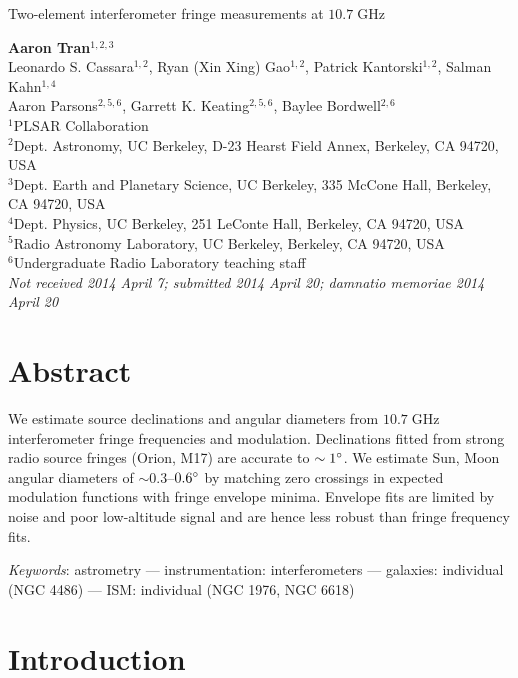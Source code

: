 \documentclass[10pt]{article}
\newcommand {\mt}{\mathrm}
\newcommand {\unit}[1]{\; \mt{#1}}
\begin{document}
\begin{center}
\Large{Two-element interferometer fringe measurements at $10.7 \unit{GHz}$}

\normalsize
\textbf{Aaron Tran}${}^{1,2,3}$ \\
Leonardo S. Cassara${}^{1,2}$, Ryan (Xin Xing) Gao${}^{1,2}$, Patrick Kantorski${}^{1,2}$, Salman Kahn${}^{1,4}$ \\
Aaron Parsons${}^{2,5,6}$, Garrett K. Keating${}^{2,5,6}$, Baylee Bordwell${}^{2,6}$ \\
\footnotesize
${}^1$PLSAR Collaboration \\
${}^2$Dept. Astronomy, UC Berkeley, D-23 Hearst Field Annex, Berkeley, CA 94720, USA \\
${}^3$Dept. Earth and Planetary Science, UC Berkeley, 335 McCone Hall, Berkeley, CA 94720, USA \\
${}^4$Dept. Physics, UC Berkeley, 251 LeConte Hall, Berkeley, CA 94720, USA \\
${}^5$Radio Astronomy Laboratory, UC Berkeley, Berkeley, CA 94720, USA \\
${}^6$Undergraduate Radio Laboratory teaching staff \\
\textit{Not received 2014 April 7; submitted 2014 April 20; damnatio memoriae 2014 April 20}
\end{center}

\section*{Abstract}

We estimate source declinations and angular diameters from $10.7 \unit{GHz}$ interferometer fringe frequencies and modulation.  Declinations fitted from strong radio source fringes (Orion, M17) are accurate to $\sim1\degree$.  We estimate Sun, Moon angular diameters of $\sim0.3$--$0.6\degree$ by matching zero crossings in expected modulation functions with fringe envelope minima.  Envelope fits are limited by noise and poor low-altitude signal and are hence less robust than fringe frequency fits.

\textit{Keywords}: astrometry --- instrumentation: interferometers --- galaxies: individual (NGC 4486) --- ISM: individual (NGC 1976, NGC 6618)

\section{Introduction}
\end{document}
